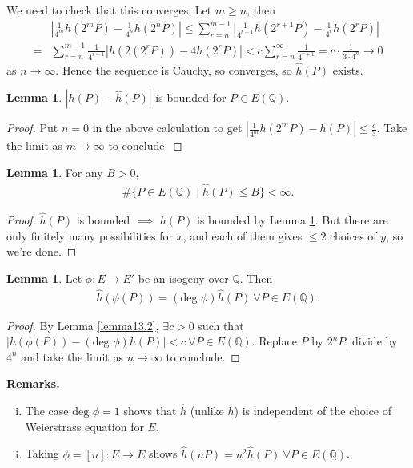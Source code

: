 \documentclass{article}
\theoremstyle{definition}
\newtheorem{lemma}[theorem]{Lemma}
\begin{document}
We need to check that this converges. Let $m\ge n$, then
\begin{align*}
    & \left|\frac{1}{4^m}h(2^mP)-\frac{1}{4^n}h(2^n P)\right| \le \sum_{r=n}^{m-1} \left|\frac{1}{4^{r+1}}h(2^{r+1}P)-\frac{1}{4^r}h(2^rP)\right|\\
    =& \sum_{r=n}^{m-1} \frac{1}{4^{r+1}}\left|h(2(2^rP))-4 h(2^rP)\right| < c \sum_{r=n}^{\infty} \frac{1}{4^{r+1}} = c \cdot \frac{1}{3\cdot 4^n} \to 0
\end{align*}
as $n \to \infty$. Hence the sequence is Cauchy, so converges, so $\widehat{h}(P)$ exists.
\begin{lemma}\label{lemma13.3}
    $\left|h(P)-\widehat{h}(P)\right|$ is bounded for $P \in E(\mathbb{Q})$.
\end{lemma}
\begin{proof}
    Put $n=0$ in the above calculation to get $\left|\frac{1}{4^m}h(2^m P)-h(P)\right|\le \frac{c}{3}$. Take the limit as $m \to \infty$ to conclude.
\end{proof}
\begin{lemma}\label{lemma13.4}
    For any $B>0$,
    \begin{align*}
        \# \{P \in E(\mathbb{Q}) \mid \widehat{h}(P) \le B\} < \infty.
    \end{align*}
\end{lemma}
\begin{proof}
    $\widehat{h}(P)$ is bounded $\implies $ $h(P)$ is bounded by Lemma \ref{lemma13.3}. But there are only finitely many possibilities for $x$, and each of them gives $\le 2$ choices of $y$, so we're done.
\end{proof}
\begin{lemma}\label{lemma13.5}
    Let $\phi :E \to E'$ be an isogeny over $\mathbb{Q}$. Then
    \begin{align*}
        \widehat{h}(\phi(P)) = (\text{deg }\phi)\widehat{h}(P) ~\forall P \in E(\mathbb{Q}).
    \end{align*}
\end{lemma}
\begin{proof}
    By Lemma \ref{lemma13.2}, $\exists c>0$ such that $\left|h(\phi(P))-(\text{deg }\phi)h(P)\right|< c ~\forall P \in E(\mathbb{Q})$. Replace $P$ by $2^nP$, divide by $4^n$ and take the limit as $n \to \infty$ to conclude.
\end{proof}
\textbf{Remarks.} 
\begin{enumerate}[(i)]
    \item The case $\text{deg }\phi = 1$ shows that $\widehat{h}$ (unlike $h$) is independent of the choice of Weierstrass equation for $E$.
    \item Taking $\phi = [n]: E \to E$ shows $\widehat{h}(nP)= n^2 \widehat{h}(P) ~\forall P \in E(\mathbb{Q})$.
\end{enumerate} 
\end{document}
